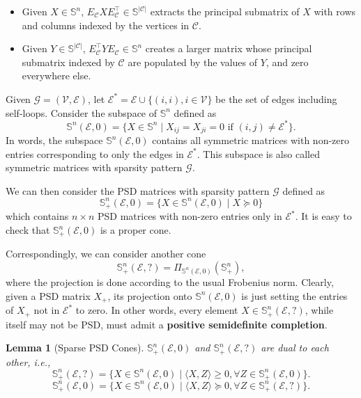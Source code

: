 \documentclass[
]{book}
\newtheorem{lemma}{Lemma}[chapter]
\theoremstyle{definition}
\theoremstyle{definition}
\theoremstyle{definition}
\theoremstyle{definition}
\theoremstyle{remark}
\begin{document}
\begin{itemize}
\item
  Given \(X \in \mathbb{S}^{n}\), \(E_{\mathcal{C}} X E_{\mathcal{C}}^\top\in \mathbb{S}^{|\mathcal{C}|}\) extracts the principal submatrix of \(X\) with rows and columns indexed by the vertices in \(\mathcal{C}\).
\item
  Given \(Y \in \mathbb{S}^{|\mathcal{C}|}\), \(E_{\mathcal{C}}^\top Y E_{\mathcal{C}} \in \mathbb{S}^{n}\) creates a larger matrix whose principal submatrix indexed by \(\mathcal{C}\) are populated by the values of \(Y\), and zero everywhere else.
\end{itemize}

Given \(\mathcal{G}= (\mathcal{V},\mathcal{E})\), let \(\mathcal{E}^* = \mathcal{E}\cup \{ (i,i), i \in \mathcal{V} \}\) be the set of edges including self-loops. Consider the subspace of \(\mathbb{S}^{n}\) defined as
\[
\mathbb{S}^{n}(\mathcal{E},0) = \{  X \in \mathbb{S}^{n} \mid X_{ij}=X_{ji} = 0 \text{ if } (i,j) \neq \mathcal{E}^* \}.
\]
In words, the subspace \(\mathbb{S}^{n}(\mathcal{E},0)\) contains all symmetric matrices with non-zero entries corresponding to only the edges in \(\mathcal{E}^*\). This subspace is also called symmetric matrices with sparsity pattern \(\mathcal{G}\).

We can then consider the PSD matrices with sparsity pattern \(\mathcal{G}\) defined as
\begin{equation}
\mathbb{S}^{n}_{+}(\mathcal{E},0) = \{  X \in \mathbb{S}^{n}(\mathcal{E},0) \mid X \succeq 0 \}
\label{eq:psd-sparsity}
\end{equation}
which contains \(n \times n\) PSD matrices with non-zero entries only in \(\mathcal{E}^*\). It is easy to check that \(\mathbb{S}^{n}_{+}(\mathcal{E},0)\) is a proper cone.

Correspondingly, we can consider another cone
\begin{equation}
\mathbb{S}^{n}_{+}(\mathcal{E},?) = \Pi_{\mathbb{S}^{n}(\mathcal{E},0)}(\mathbb{S}^{n}_{+}),
\label{eq:psd-sparsity-dual}
\end{equation}
where the projection is done according to the usual Frobenius norm. Clearly, given a PSD matrix \(X_+\), its projection onto \(\mathbb{S}^{n}(\mathcal{E},0)\) is just setting the entries of \(X_+\) not in \(\mathcal{E}^*\) to zero. In other words, every element \(X \in \mathbb{S}^{n}_{+}(\mathcal{E},?)\), while itself may not be PSD, must admit a \textbf{positive semidefinite completion}.

\begin{lemma}[Sparse PSD Cones]
\protect\hypertarget{lem:SparsePSDCone}{}\label{lem:SparsePSDCone}\(\mathbb{S}^{n}_{+}(\mathcal{E},0)\) and \(\mathbb{S}^{n}_{+}(\mathcal{E},?)\) are dual to each other, i.e.,
\[
\mathbb{S}^{n}_{+}(\mathcal{E},?) = \{ X \in \mathbb{S}^{n}(\mathcal{E},0)  \mid \langle X, Z \rangle \geq 0, \forall Z \in \mathbb{S}^{n}_{+}(\mathcal{E},0) \}.
\]
\[
\mathbb{S}^{n}_{+}(\mathcal{E},0) = \{ X \in \mathbb{S}^{n}(\mathcal{E},0) \mid \langle X, Z \rangle \succeq 0, \forall Z \in \mathbb{S}^{n}_{+}(\mathcal{E},?) \}.
\]
\end{lemma}
\end{document}
